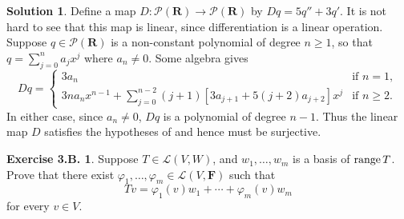 \documentclass[12pt]{article}
\theoremstyle{definition}
\theoremstyle{exercise}
\newtheorem{exercise}{Exercise 3.B.}
\theoremstyle{solution}
\newtheorem*{solution}{Solution}
\newcommand{\poly}{\mathcal{P}}
\newcommand{\lmap}{\mathcal{L}}
\newcommand{\Range}{\text{range\,}}
\newcommand{\R}{\mathbf{R}}
\newcommand{\F}{\mathbf{F}}
\begin{document}
\begin{solution}
    Define a map \( D : \poly(\R) \to \poly(\R) \) by \( Dq = 5q'' + 3q' \). It is not hard to see that this map is linear, since differentiation is a linear operation. Suppose \( q \in \poly(\R) \) is a non-constant polynomial of degree \( n \geq 1 \), so that \( q = \sum_{j=0}^n a_j x^j \) where \( a_n \neq 0 \). Some algebra gives
    \[
        Dq = \begin{cases}
            3 a_n & \text{if } n = 1, \\
            3n a_n x^{n-1} + \sum_{j=0}^{n-2} (j+1)[3 a_{j+1} + 5(j+2) a_{j+2}] x^j & \text{if } n \geq 2.
        \end{cases}
    \]
    In either case, since \( a_n \neq 0 \), \( Dq \) is a polynomial of degree \( n - 1 \). Thus the linear map \( D \) satisfies the hypotheses of  and hence must be surjective.
\end{solution}

\begin{exercise}
\label{ex:28}
    Suppose \( T \in \lmap(V, W) \), and \( w_1, \ldots, w_m \) is a basis of \( \Range T \). Prove that there exist \( \varphi_1, \ldots, \varphi_m \in \lmap(V, \F) \) such that
    \[
        Tv = \varphi_1(v) w_1 + \cdots + \varphi_m(v) w_m
    \]
    for every \( v \in V \).
\end{exercise}
\end{document}
